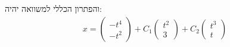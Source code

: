 \documentclass{article}
\begin{document}
והפתרון הכללי למשוואה יהיה:
\begin{align*}
    x=\begin{pmatrix}
          -t^4 \\
          -t^2
      \end{pmatrix}+C_1\begin{pmatrix}
                           t^2 \\
                           3
                       \end{pmatrix}+C_2\begin{pmatrix}
                                            t^3 \\
                                            t
                                        \end{pmatrix}
\end{align*}
\end{document}
